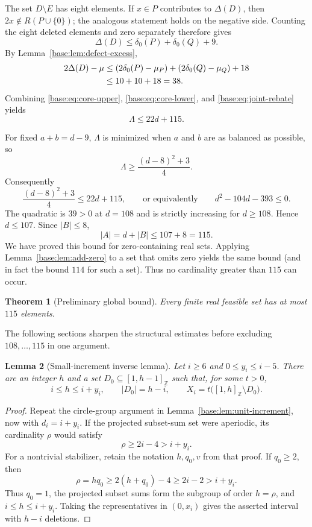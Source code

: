\documentclass[11pt,a4paper]{article}
\newtheorem{theorem}{Theorem}[section]
\newtheorem{lemma}[theorem]{Lemma}
\theoremstyle{remark}
\newcommand{\card}[1]{\lvert #1\rvert}
\begin{document}
The set $D\setminus E$ has eight elements.  If $x\in P$ contributes to
$\Delta(D)$, then $2x\notin R(P\cup\{0\})$; the analogous statement holds
on the negative side.  Counting the eight deleted elements and zero separately
therefore gives
\begin{equation}
 \Delta(D)\leq\delta_0(P)+\delta_0(Q)+9.
 \label{base:eq:delta-split}
\end{equation}
By Lemma~\ref{base:lem:defect-excess},
\begin{align}
 2\Delta(D)-\mu
 &\leq(2\delta_0(P)-\mu_P)+(2\delta_0(Q)-\mu_Q)+18\notag\\
 &\leq10+10+18=38.
 \label{base:eq:joint-rebate}
\end{align}
Combining \eqref{base:eq:core-upper}, \eqref{base:eq:core-lower}, and
\eqref{base:eq:joint-rebate} yields
\begin{equation}
 \Lambda\leq22d+115.
 \label{base:eq:lambda-upper}
\end{equation}

For fixed $a+b=d-9$, $\Lambda$ is minimized when $a$ and $b$ are as balanced
as possible, so
\[
 \Lambda\geq\frac{(d-8)^2+3}{4}.
\]
Consequently
\[
 \frac{(d-8)^2+3}{4}\leq22d+115,
 \qquad\text{or equivalently}\qquad
 d^2-104d-393\leq0.
\]
The quadratic is $39>0$ at $d=108$ and is strictly increasing for
$d\geq108$.  Hence $d\leq107$.  Since $\card B\leq8$,
\[
 \card A=d+\card B\leq107+8=115.
\]
We have proved this bound for zero-containing real sets. Applying
Lemma~\ref{base:lem:add-zero} to a set that omits zero yields the same bound
(and in fact the bound $114$ for such a set). Thus no cardinality greater
than $115$ can occur.

\begin{theorem}[Preliminary global bound]\label{base:thm:upper115}
Every finite real feasible set has at most $115$ elements.
\end{theorem}

The following sections sharpen the structural estimates before excluding
$108,\ldots,115$ in one argument.

\begin{lemma}[Small-increment inverse lemma]\label{base:lem:small-increment}
Let $i\geq6$ and $0\leq y_i\leq i-5$.  There are an integer $h$ and a set
$D_0\subseteq[1,h-1]_{\mathbb Z}$ such that, for some $t>0$,
\[
 i\leq h\leq i+y_i,\qquad \card{D_0}=h-i,\qquad
 X_i=t\bigl([1,h]_{\mathbb Z}\setminus D_0\bigr).
\]
\end{lemma}

\begin{proof}
Repeat the circle-group argument in Lemma~\ref{base:lem:unit-increment}, now with
$d_i=i+y_i$.  If the projected subset-sum set were aperiodic, its cardinality
$\rho$ would satisfy
\[
 \rho\geq2i-4>i+y_i.
\]
For a nontrivial stabilizer, retain the notation $h,q_0,v$ from that proof.
If $q_0\geq2$, then
\[
 \rho=hq_0\geq2(h+q_0)-4\geq2i-2>i+y_i.
\]
Thus $q_0=1$, the projected subset sums form the subgroup of order
$h=\rho$, and $i\leq h\leq i+y_i$.  Taking the representatives in $(0,x_i)$
gives the asserted interval with $h-i$ deletions.
\end{proof}
\end{document}
